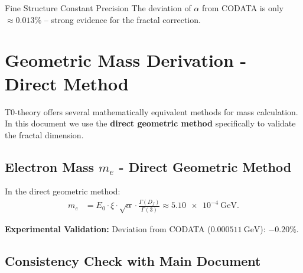 	\begin{result}{Fine Structure Constant Precision}{}
		The deviation of $\alpha$ from CODATA is only $\approx 0.013\%$ -- strong evidence for the fractal correction.
	\end{result}
	
	\section{Geometric Mass Derivation - Direct Method}
	\label{sec:geometric_derivation}
	
	T0-theory offers several mathematically equivalent methods for mass calculation. In this document we use the \textbf{direct geometric method} specifically to validate the fractal dimension.
	
	\subsection{Electron Mass $m_e$ - Direct Geometric Method}
	\label{subsec:electron_mass}
	
	In the direct geometric method:
	\begin{align}
		m_e &= E_0 \cdot \xi \cdot \sqrt{\alpha} \cdot \frac{\Gamma(D_f)}{\Gamma(3)} \approx \SI{5.10e-4}{\giga\electronvolt}. \label{eq:me_direct}
	\end{align}
	
	\textbf{Experimental Validation:} Deviation from CODATA ($\SI{0.000511}{\giga\electronvolt}$): $-0.20\%$.
	
	\subsection{Consistency Check with Main Document}
	\label{subsec:consistency_check}
	
	\begin{table}[H]
		\centering
		\caption{Consistency of mass calculation methods in T0-theory}
		\label{tab:method_consistency}
	\end{table}
	
